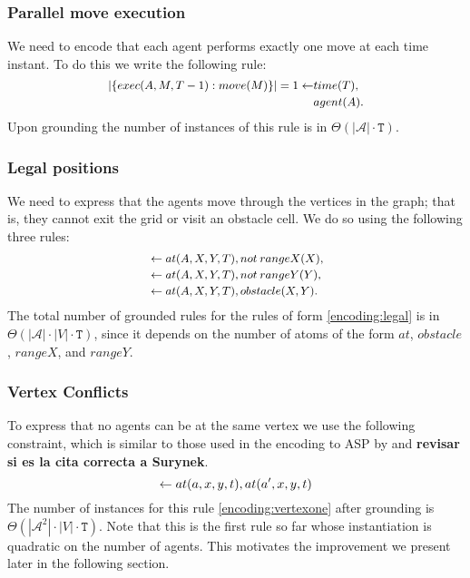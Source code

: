\subsubsection{Parallel move execution}
We need to encode that each agent performs exactly one move at each time instant. To do this we write the following rule:
\begin{equation}\small\label{encoding:delta}
\begin{split}
|\{exec(A,M,T-1) : move(M) \}| = 1 \leftarrow &time(T),\\&agent(A).
\end{split}
\end{equation}
Upon grounding the number of instances of this rule is in $\Theta(|\mathcal{A}|\cdot \mathtt{T})$.
\subsubsection{Legal positions}
We need to express that the agents move through the vertices in the graph; that is, they cannot exit the grid or visit an obstacle cell. We do so using the following three rules:
\begin{equation}\label{encoding:legal}\small
    \begin{split}
&\leftarrow at(A,X,Y,T), not\: rangeX(X),\\
&\leftarrow at(A,X,Y,T), not\: rangeY(Y),\\
&\leftarrow at(A,X,Y,T), obstacle(X,Y). %
    \end{split}
\end{equation}
The total number of grounded rules for the rules of form \eqref{encoding:legal} is in $\Theta(|\mathcal{A}| \cdot |V| \cdot \mathtt{T})$, since it depends on the number of atoms of the form $at$, $obstacle$, $rangeX$, and $rangeY$.

\subsubsection{Vertex Conflicts}
To express that no agents can be at the same vertex we use the following constraint, which is similar to those used in the encoding to ASP by  and  \textbf{revisar si es la cita correcta a Surynek}.
\begin{equation}\small\label{encoding:vertexone}
    \leftarrow at(a,x,y,t), at(a',x,y,t)
\end{equation}
The number of instances for this rule \eqref{encoding:vertexone} after grounding is $\Theta(|\mathcal{A}^2| \cdot |V| \cdot \mathtt{T})$. Note that this is the first rule so far whose instantiation is quadratic on the number of agents. This motivates the improvement we present later in the following section.
